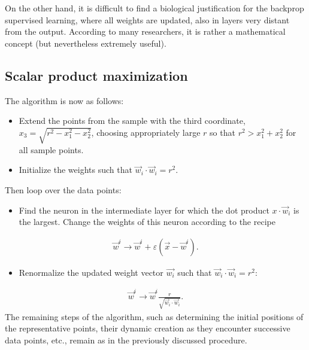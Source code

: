 \documentclass[letterpaper,10pt,english]{jupyterBook}
\begin{document}
\sphinxAtStartPar
On the other hand, it is difficult to find a biological justification for the backprop supervised learning, where all weights are updated, also in layers very distant from the output. According to many researchers, it is rather a mathematical concept (but nevertheless extremely useful).


\subsection{Scalar product maximization}
\label{\detokenize{docs/unsupervised:scalar-product-maximization}}
\sphinxAtStartPar
The algorithm is now as follows:
\begin{itemize}
\item {} 
\sphinxAtStartPar
Extend the points from the sample with the third coordinate, \( x_3 = \sqrt {r ^ 2-x_1 ^ 2-x_2 ^ 2} \), choosing appropriately large \( r \) so that \( r ^ 2> x_1 ^ 2 + x_2 ^ 2 \) for all sample points.

\item {} 
\sphinxAtStartPar
Initialize the weights such that \( \vec {w} _i \cdot \vec {w} _i = r ^ 2 \).

\end{itemize}

\sphinxAtStartPar
Then loop over the data points:
\begin{itemize}
\item {} 
\sphinxAtStartPar
Find the neuron in the intermediate layer for which the dot product \( x \cdot \vec {w} _i \) is the largest. Change the weights of this neuron according to the recipe

\end{itemize}
\begin{equation*}
\begin{split} \vec {w} ^ i \to \vec {w} ^ i + \varepsilon (\vec {x} - \vec {w} ^ i). \end{split}
\end{equation*}\begin{itemize}
\item {} 
\sphinxAtStartPar
Renormalize the updated weight vector \( \vec {w_i} \) such that \( \vec {w} _i \cdot \vec {w} _i = r ^ 2 \):

\end{itemize}
\begin{equation*}
\begin{split} \vec {w} ^ i \to \vec {w} ^ i \frac {r} {\sqrt {\vec {w} _i \cdot \vec {w} _i}}. \end{split}
\end{equation*}
\sphinxAtStartPar
The remaining steps of the algorithm, such as determining the initial positions of the representative points, their dynamic creation as they encounter successive data points, etc., remain as in the previously discussed procedure.
\end{document}
